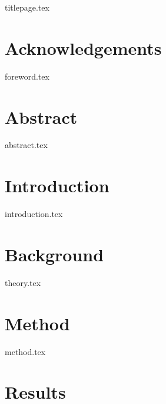 \documentclass[twocolumn, a4paper]{report}
\begin{document}
{titlepage.tex}

\onecolumn
\chapter*{Acknowledgements}
{foreword.tex}

\onecolumn
\chapter*{Abstract}
{abstract.tex}

\tableofcontents
\newpage


\twocolumn
\chapter{Introduction}
{introduction.tex}


\chapter{Background}
{theory.tex}

\chapter{Method}
{method.tex}

\chapter{Results}
\end{document}
